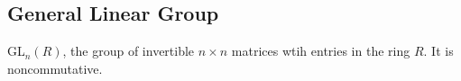\subsection{General Linear Group}\label{generallineargroup}
GL$_n(R)$, the group of invertible $n \times n$ matrices wtih entries in the ring $R$. It is noncommutative.